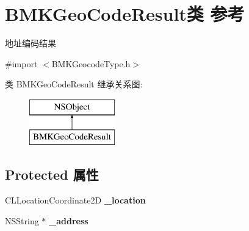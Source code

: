 \hypertarget{interface_b_m_k_geo_code_result}{}\section{B\+M\+K\+Geo\+Code\+Result类 参考}
\label{interface_b_m_k_geo_code_result}


地址编码结果  




{\ttfamily \#import $<$B\+M\+K\+Geocode\+Type.\+h$>$}

类 B\+M\+K\+Geo\+Code\+Result 继承关系图\+:\begin{figure}[H]
\begin{center}
\leavevmode
\includegraphics[height=2.000000cm]{interface_b_m_k_geo_code_result}
\end{center}
\end{figure}
\subsection*{Protected 属性}
\begin{DoxyCompactItemize}
\item 
\hypertarget{interface_b_m_k_geo_code_result_a24d63bcf89a08aaf8d2c74bfbbcf3f41}{}C\+L\+Location\+Coordinate2\+D {\bfseries \+\_\+location}\label{interface_b_m_k_geo_code_result_a24d63bcf89a08aaf8d2c74bfbbcf3f41}

\item 
\hypertarget{interface_b_m_k_geo_code_result_a7d9c5ba3e65ea13e9787ba3c00273f1c}{}N\+S\+String $\ast$ {\bfseries \+\_\+address}\label{interface_b_m_k_geo_code_result_a7d9c5ba3e65ea13e9787ba3c00273f1c}

\end{DoxyCompactItemize}
